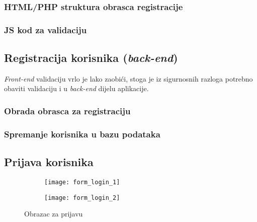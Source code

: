       \subsubsection{HTML/PHP struktura obrasca registracije}

        

      \subsubsection{JS kod za validaciju}

        

  \subsection{Registracija korisnika (\textit{back-end})}

    \textit{Front-end} validaciju vrlo je lako zaobići, stoga je iz
    sigurnosnih razloga potrebno obaviti validaciju i u \textit{back-end}
    dijelu aplikacije.

    \subsubsection{Obrada obrasca za registraciju}

      

    \subsubsection{Spremanje korisnika u bazu podataka}

      

  \subsection{Prijava korisnika}

    \begin{figure}[h]
      \begin{subfigure}{0.5\textwidth}
        \texttt{[image: form\_login\_1]}
      \end{subfigure}
      \begin{subfigure}{0.5\textwidth}
        \texttt{[image: form\_login\_2]}
      \end{subfigure}

      \caption{Obrazac za prijavu}
    \end{figure}

